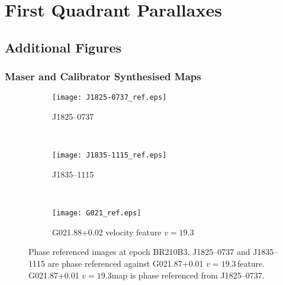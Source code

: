 \appendix

\chapter[ADDITIONAL TABLES AND FIGURES 1]{First Quadrant Parallaxes}
	\section{Additional Figures}
		\subsection{Maser and Calibrator Synthesised Maps}
        
        
        	\begin{figure}[h]
        		\begin{subfigure}[t]{0.3\textwidth}
        			\texttt{[image: J1825-0737\_ref.eps]}
        			\caption{J1825--0737}
        		\end{subfigure}
        		~
        		\begin{subfigure}[t]{0.3\textwidth}
        			\texttt{[image: J1835-1115\_ref.eps]}
        			\caption{J1835--1115}
        		\end{subfigure}
        		~
        		\begin{subfigure}[t]{0.3\textwidth}
        			\texttt{[image: G021\_ref.eps]}
        			\caption{G021.88+0.02 velocity feature $v=19.3$\kms}
        		\end{subfigure}
        		\caption[G021.87$+$0.01 maps]{Phase referenced images at epoch BR210B3. J1825--0737 and J1835--1115 are phase referenced against G021.87+0.01 $v=19.3$\,\kms feature. G021.87+0.01 $v=19.3$\kms map is phase referenced from J1825--0737. }
        		\label{fig:g21_ref}
        	\end{figure}
        
        

